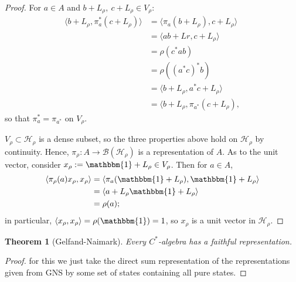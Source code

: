 \documentclass[12pt,a4paper]{amsart}
\theoremstyle{plain}
\newtheorem{thm}{Theorem}
\theoremstyle{definition}
\newcommand{\B}{\mathcal{B}}
\newcommand{\Hr}{\mathcal{H}_\rho}
\newcommand{\1}{\mathbbm{1}}
\newcommand{\Vr}{V_\rho}
\newcommand{\Lr}{L_\rho}
\newcommand{\xr}{x_\rho}
\begin{document}
\begin{proof}
	
	For $a\in A$ and $b+ L_\rho,~c+ L_\rho \in \Vr$:
	\begin{align*}
				\langle b+\Lr, \pi_a^\ast (c+\Lr) \rangle 
		&=		\langle \pi_a (b+\Lr), c+\Lr \rangle						\\
		&=		\langle ab +Lr, c+\Lr \rangle								\\
		&=		\rho(c^\ast ab)												\\
		&=		\rho((a^\ast c)^\ast b)										\\
		&=		\langle b+\Lr, a^\ast c+\Lr \rangle							\\
		&=		\langle b+\Lr, \pi_{a^\ast}(c+\Lr),
	\end{align*}
	so that $ \pi_a^\ast = \pi_{a^\ast}$ on $\Vr$.
	
	$\Vr \subset \Hr$ is a dense subset, so the three properties above hold on 
	$\Hr$ by continuity.  %
	Hence, $\pi_\rho: A \to \B(\Hr)$ is a representation of $A$.
	As to the unit vector, consider $\xr := \1 + \Lr \in \Vr$. Then for $a \in A$,
	\begin{align*}
				\langle \pi_\rho(a)\xr ,\xr \rangle 
		&=		\langle \pi_a(\1+\Lr), \1+\Lr \rangle						\\
		&=		\langle a+\Lr \1+\Lr \rangle								\\
		&=		\rho(a);
	\end{align*}
	in particular, $\langle \xr,\xr \rangle = \rho (\1) = 1$, so $\xr$ is a unit vector in $\Hr$.	
\end{proof}


\begin{thm}[Gelfand-Naimark]
	Every $C^\ast$-algebra has a faithful representation.
\end{thm}
\begin{proof}
	for this we just take the direct sum representation of the representations given from GNS
	by some set of states containing all pure states.
\end{proof}

\end{document}
